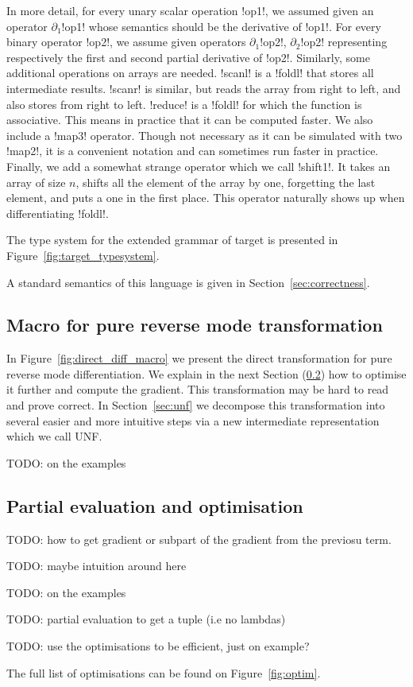 

In more detail, for every unary scalar operation !op1!, 
we assumed given an operator $\partial_1$!op1! whose semantics should be the derivative of !op1!.
For every binary operator !op2!, we assume given operators $\partial_1$!op2!, $\partial_2$!op2! 
representing respectively the first and second partial derivative of !op2!.
Similarly, some additional operations on arrays are needed. 
!scanl! is a !foldl! that stores all intermediate results. 
!scanr! is similar, but reads the array from right to left, and also stores from right to left.
!reduce! is a !foldl! for which the function is associative. 
This means in practice that it can be computed faster.
We also include a !map3! operator. 
Though not necessary as it can be simulated with two !map2!, it is a convenient notation and can sometimes run faster in practice.
Finally, we add a somewhat strange operator which we call !shift1!. 
It takes an array of size $n$,  shifts all the element of the array by one, 
forgetting the last element, and puts a one in the first place. 
This operator naturally shows up when differentiating !foldl!.

The type system for the extended grammar of target is presented in Figure~\ref{fig:target_typesystem}. 



A standard semantics of this language is given in Section~\ref{sec:correctness}.

\subsection{Macro for pure reverse mode transformation} %
\label{sub:Macro for pure reverse mode transformation}

In Figure~\ref{fig:direct_diff_macro} we present the direct transformation for pure reverse mode differentiation.
We explain in the next Section (\ref{sub:Partial evaluation and optimisation}) how to optimise it further and compute the gradient.
This transformation may be hard to read and prove correct. 
In Section~\ref{sec:unf} we decompose this transformation into several easier 
and more intuitive steps via a new intermediate representation which we call UNF.

TODO: on the examples



\subsection{Partial evaluation and optimisation} %
\label{sub:Partial evaluation and optimisation}

TODO: how to get gradient or subpart of the gradient from the previosu term.

TODO: maybe intuition around here

TODO: on the examples

TODO: partial evaluation to get a tuple (i.e no lambdas)

TODO: use the optimisations to be efficient, just on example?

The full list of optimisations can be found on Figure~\ref{fig:optim}.